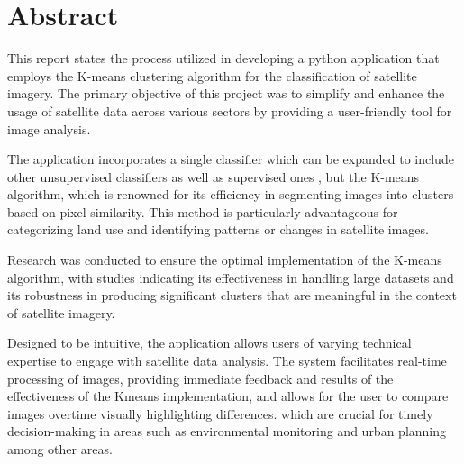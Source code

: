 \thispagestyle{empty}

\section*{\centering Abstract}

This report states the process utilized in developing a python application that employs
the K-means clustering algorithm for the classification of satellite imagery.
The primary objective of this project was to simplify and enhance the usage of satellite data across various sectors
by providing a user-friendly tool for image analysis.

The application incorporates a single classifier which can be expanded to include other unsupervised classifiers as well as supervised ones
, but the K-means algorithm, which is renowned for its efficiency in segmenting images into clusters based on pixel similarity.
This method is particularly advantageous for categorizing land use and identifying patterns or changes in satellite images.

Research was conducted to ensure the optimal implementation of the K-means algorithm, with studies indicating its effectiveness
in handling large datasets and its robustness in producing significant clusters that are meaningful in the context of satellite imagery.

Designed to be intuitive, the application allows users of varying technical expertise to engage with satellite data analysis.
The system facilitates real-time processing of images, providing immediate feedback and results of the effectiveness of the Kmeans implementation,
and allows for the user to compare images overtime visually highlighting differences.
which are crucial for timely decision-making in areas such as environmental monitoring and urban planning among other areas.

